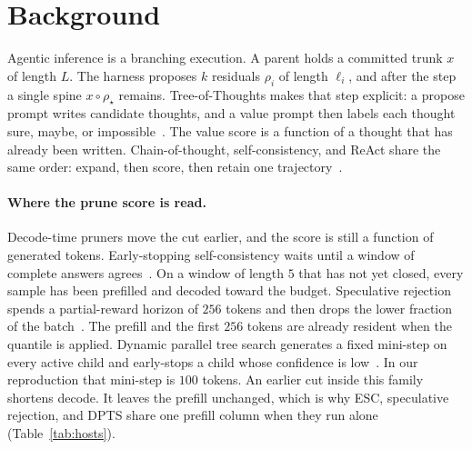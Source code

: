 \section{Background}
\label{sec:background}

Agentic inference is a branching execution.
A parent holds a committed trunk $x$ of length $L$.
The harness proposes $k$ residuals $\rho_i$ of length $\ell_i$, and after the step a single spine $x\circ\rho_\star$ remains.
Tree-of-Thoughts makes that step explicit: a propose prompt writes candidate thoughts, and a value prompt then labels each thought sure, maybe, or impossible~\citep{tot}.
The value score is a function of a thought that has already been written.
Chain-of-thought, self-consistency, and ReAct share the same order: expand, then score, then retain one trajectory~\citep{cot,selfconsistency,react}.

\paragraph{Where the prune score is read.}
Decode-time pruners move the cut earlier, and the score is still a function of generated tokens.
Early-stopping self-consistency waits until a window of complete answers agrees~\citep{esc}.
On a window of length $5$ that has not yet closed, every sample has been prefilled and decoded toward the budget.
Speculative rejection spends a partial-reward horizon of $256$ tokens and then drops the lower fraction of the batch~\citep{specrej}.
The prefill and the first $256$ tokens are already resident when the quantile is applied.
Dynamic parallel tree search generates a fixed mini-step on every active child and early-stops a child whose confidence is low~\citep{dpts}.
In our reproduction that mini-step is $100$ tokens.
An earlier cut inside this family shortens decode.
It leaves the prefill unchanged, which is why ESC, speculative rejection, and DPTS share one prefill column when they run alone (Table~\ref{tab:hosts}).

